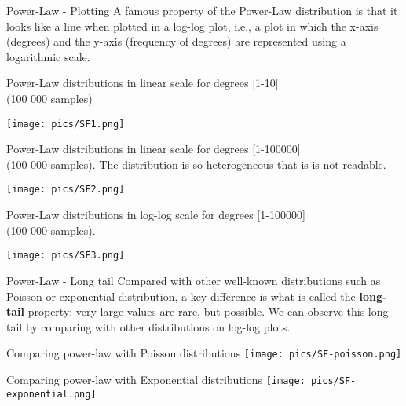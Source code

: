 \begin{textbox}{Power-Law - Plotting}
    A famous property of the Power-Law distribution is that it looks like a line when plotted in a log-log plot, i.e., a plot in which the x-axis (degrees) and the y-axis (frequency of degrees) are represented using a logarithmic scale.
    \begin{center}
        Power-Law distributions in linear scale for degrees [1-10] \\
        (100 000 samples)

        \texttt{[image: pics/SF1.png]}

        Power-Law distributions in linear scale for degrees [1-100000] \\
        (100 000 samples). The distribution is so heterogeneous that is is not readable.

        \texttt{[image: pics/SF2.png]}

        Power-Law distributions in log-log scale for degrees [1-100000] \\
        (100 000 samples).

        \texttt{[image: pics/SF3.png]}
    \end{center}
\end{textbox}


\begin{textbox}{Power-Law - Long tail}
    Compared with other well-known distributions such as Poisson or exponential distribution, a key difference is what is called the \textbf{long-tail} property: very large values are rare, but possible. We can observe this long tail by comparing with other distributions on log-log plots.

    \begin{center}
        Comparing power-law with Poisson distributions
        \texttt{[image: pics/SF-poisson.png]}

        Comparing power-law with Exponential distributions
        \texttt{[image: pics/SF-exponential.png]}
    \end{center}
\end{textbox}


